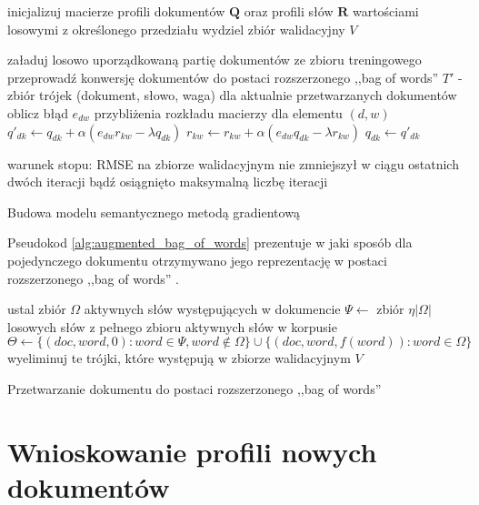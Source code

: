 \documentclass{pracamgr}
\newcommand{\abs}[1]{\lvert#1\rvert}
\begin{document}
\begin{algorithm}
inicjalizuj macierze profili dokumentów $\mathbf{Q}$ oraz profili słów $\mathbf{R}$ wartościami losowymi z określonego przedziału\;
wydziel zbiór walidacyjny $V$\;
 {
    załaduj losowo uporządkowaną partię dokumentów ze zbioru treningowego\;
    przeprowadź konwersję dokumentów do postaci rozszerzonego ,,bag of words''\;
    $T'$ - zbiór trójek (dokument, słowo, waga) dla aktualnie przetwarzanych dokumentów\;
     {
        oblicz błąd $e_{dw}$ przybliżenia rozkładu macierzy dla elementu $(d, w)$\;
         { 
            $q'_{dk} \gets q_{dk} + \alpha (e_{dw} r_{kw} - \lambda q_{dk})$\;
            $r_{kw} \gets r_{kw} + \alpha (e_{dw} q_{dk} - \lambda r_{kw})$\;
            $q_{dk} \gets q'_{dk}$\;
        }
    }
    
    warunek stopu: RMSE na zbiorze walidacyjnym nie zmniejszył w ciągu ostatnich dwóch iteracji bądź osiągnięto maksymalną liczbę iteracji
}
\caption{Budowa modelu semantycznego metodą gradientową}
\label{alg:model_building}
\end{algorithm}

Pseudokod \ref{alg:augmented_bag_of_words} prezentuje w jaki sposób dla pojedynczego dokumentu otrzymywano jego reprezentację w postaci rozszerzonego ,,bag of words'' .

\begin{algorithm}

ustal zbiór $\Omega$ aktywnych słów występujących w dokumencie\;
$\Psi \gets $ zbiór $\eta \abs{\Omega}$ losowych słów z pełnego zbioru aktywnych słów w korpusie\;
$\Theta \gets \{ (doc, word, 0) : word \in \Psi, word \notin \Omega\} \cup \{(doc, word, f(word)) : word \in \Omega\}$\;
wyeliminuj te trójki, które występują w zbiorze walidacyjnym $V$\;

\caption{Przetwarzanie dokumentu do postaci rozszerzonego ,,bag of words''}
\label{alg:augmented_bag_of_words}
\end{algorithm}

\section{Wnioskowanie profili nowych dokumentów}
\end{document}
